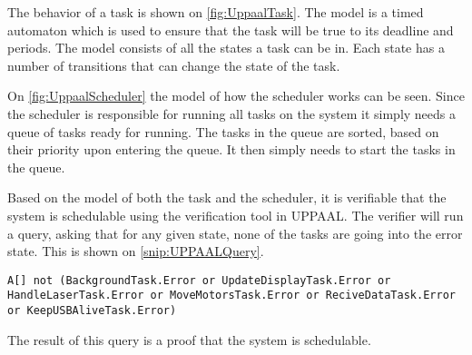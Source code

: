 The behavior of a task is shown on \autoref{fig:UppaalTask}.
The model is a timed automaton which is used to ensure that the task will be true to its deadline and periods.
The model consists of all the states a task can be in.
Each state has a number of transitions that can change the state of the task.


On \autoref{fig:UppaalScheduler} the model of how the scheduler works can be seen.
Since the scheduler is responsible for running all tasks on the system it simply needs a queue of tasks ready for running.
The tasks in the queue are sorted, based on their priority upon entering the queue.
It then simply needs to start the tasks in the queue.


Based on the model of both the task and the scheduler, it is verifiable that the system is schedulable using the verification tool in UPPAAL.
The verifier will run a query, asking that for any given state, none of the tasks are going into the error state.
This is shown on \autoref{snip:UPPAALQuery}.
\begin{lstlisting}[label={snip:UPPAALQuery},caption={Query from UPPAAL verifier},frame=tlrb,numbers=none]
A[] not (BackgroundTask.Error or UpdateDisplayTask.Error or HandleLaserTask.Error or MoveMotorsTask.Error or ReciveDataTask.Error or KeepUSBAliveTask.Error)
\end{lstlisting}
The result of this query is a proof that the system is schedulable.
